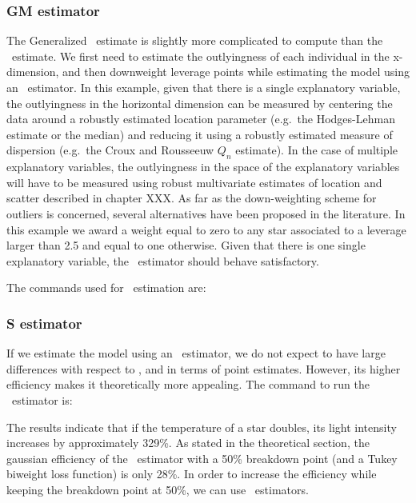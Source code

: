 \subsubsection{GM estimator}

The Generalized ~estimate is slightly more complicated to compute than
the ~estimate. We first need to estimate the outlyingness of each
individual in the x-dimension, and then downweight leverage points while
estimating the model using an ~estimator. In this example, given that
there is a single explanatory variable, the outlyingness in the horizontal
dimension can be measured by centering the data around a robustly estimated
location parameter (e.g.\ the Hodges-Lehman estimate or the median) and reducing
it using a robustly estimated measure of dispersion (e.g.\ the Croux and
Rousseeuw $Q_n$ estimate). In the case of multiple explanatory variables, the
outlyingness in the space of the explanatory variables will have to be measured
using robust multivariate estimates of location and scatter described in
chapter \alert{XXX}. As far as the down-weighting scheme for outliers is
concerned, several alternatives have been proposed in the literature. In this
example we award a weight equal to zero to any star associated to a leverage
larger than 2.5 and equal to one otherwise. Given that there is one single
explanatory variable, the ~estimator should behave satisfactory.

The commands used for ~estimation are:                                 

\begin{stlog}

\end{stlog}


\subsubsection{S estimator}

If we estimate the model using an ~estimator, we do not expect to have
large differences with respect to ,  and  in terms
of point estimates. However, its higher efficiency makes it theoretically more
appealing. The command to run the ~estimator is:

\begin{stlog}

\end{stlog}

The results indicate that if the temperature of a star doubles, its light
intensity increases by approximately 329\%. As stated in the theoretical
section, the gaussian efficiency of the ~estimator with a 50\%
breakdown point (and a Tukey biweight loss function) is only 28\%. In order to
increase the efficiency while keeping the breakdown point at 50\%, we can use
~estimators.

